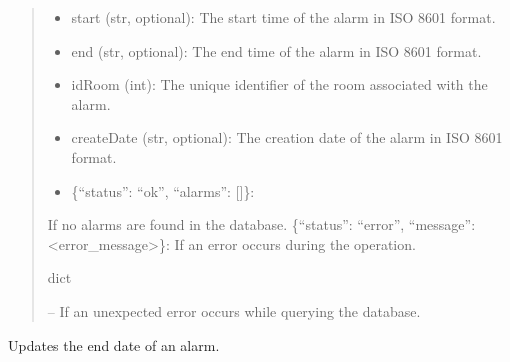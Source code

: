\documentclass[letterpaper,10pt,english]{sphinxmanual}
\begin{document}
\begin{fulllineitems}
\begin{fulllineitems}
\begin{quote}
\begin{description}
\begin{description}
\begin{description}
\begin{itemize}
\item {} 
\sphinxAtStartPar
start (str, optional): The start time of the alarm in ISO 8601 format.

\item {} 
\sphinxAtStartPar
end (str, optional): The end time of the alarm in ISO 8601 format.

\item {} 
\sphinxAtStartPar
idRoom (int): The unique identifier of the room associated with the alarm.

\item {} 
\sphinxAtStartPar
createDate (str, optional): The creation date of the alarm in ISO 8601 format.

\end{itemize}

\end{description}
\begin{itemize}
\item {} 
\sphinxAtStartPar
\{“status”: “ok”, “alarms”: {[}{]}\}:

\end{itemize}

\sphinxAtStartPar
If no alarms are found in the database.
\sphinxhyphen{} \{“status”: “error”, “message”: <error\_message>\}:
If an error occurs during the operation.

\end{description}


\sphinxAtStartPar
dict

\sphinxAtStartPar
{} – If an unexpected error occurs while querying the database.

\end{description}\end{quote}

\end{fulllineitems}


\begin{fulllineitems}
\label{\detokenize{app.controllers:app.controllers.alarm_controller.AlarmController.updateAlarmEndDate}}
\pysigstartsignatures
\pysiglinewithargsret
{}
{\sphinxparamcomma {}\sphinxparamcomma {}}
{}
\pysigstopsignatures
\sphinxAtStartPar
Updates the end date of an alarm.


\end{fulllineitems}
\end{fulllineitems}
\end{document}
